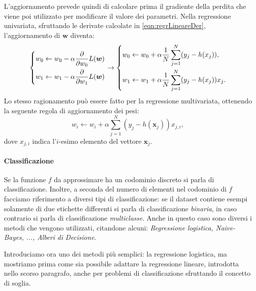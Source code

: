 \documentclass[../../main.tex]{subfiles}
\begin{document}
    L'aggiornamento prevede quindi di calcolare prima il gradiente della perdita che viene poi utilizzato per modificare il valore dei parametri. Nella regressione univariata, sfruttando le derivate calcolate in \eqref{eqn:regrLineareDer}, l'aggiornamento di $\boldsymbol{w}$ diventa:
    \[
        \begin{dcases}
            w_0 \leftarrow w_0 - \alpha \frac{\partial}{\partial w_0} L(\boldsymbol{w})\\
            w_1 \leftarrow w_1- \alpha \frac{\partial}{\partial w_1} L(\boldsymbol{w})
        \end{dcases}
        \rightarrow
        \begin{dcases}
            w_0 \leftarrow w_0 + \alpha \frac{1}{N} \sum_{j=1}^N (y_j - h(x_j)),\\
            w_1 \leftarrow w_1 + \alpha \frac{1}{N} \sum_{j=1}^N (y_j - h(x_j))x_j.
        \end{dcases}
    \]
    Lo stesso ragionamento può essere fatto per la regressione multivariata, ottenendo la seguente regola di aggiornamento dei pesi:
    \[w_i \leftarrow w_i + \alpha \sum_{j=1}^N(y_j - h(\boldsymbol{x}_j))x_{j,i},\]
    dove $x_{j,i}$ indica l'$i$-esimo elemento del vettore $\boldsymbol{x}_j$.

    \paragraph{Classificazione} Se la funzione $f$ da approssimare ha un codominio discreto si parla di classificazione. Inoltre, a seconda del numero di elementi nel codominio di $f$ facciamo riferimento a diversi tipi di classificazione: se il dataset contiene esempi solamente di due etichette differenti si parla di classificazione \textit{binaria}, in caso contrario si parla di classificazione \textit{multiclasse}. Anche in questo caso sono diversi i metodi che vengono utilizzati, citandone alcuni: \textit{Regressione logistica, Naive-Bayes, ..., Alberi di Decisione}.
    
    Introduciamo ora uno dei metodi più semplici: la regressione logistica, ma mostriamo prima come sia possibile adattare la regressione lineare, introdotta nello scorso paragrafo, anche per problemi di classificazione sfruttando il concetto di soglia.
\end{document}
